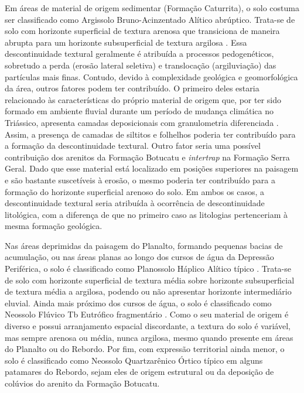 Em áreas de material de origem sedimentar (Formação Caturrita), o solo costuma ser classificado como 
Argissolo Bruno-Acinzentado Alítico abrúptico. Trata-se de solo com horizonte superficial de textura arenosa 
que transiciona de maneira abrupta para um horizonte subsuperficial de textura argilosa \cite{Miguel2010}. 
Essa descontinuidade textural geralmente é atribuída a processos pedogenéticos, sobretudo a perda (erosão 
lateral seletiva) e translocação (argiluviação) das partículas mais finas. Contudo, devido à complexidade 
geológica e geomorfológica da área, outros fatores podem ter contribuído. O primeiro deles estaria relacionado 
às características do próprio material de origem que, por ter sido formado em ambiente fluvial durante um 
período de mudança climática no Triássico, apresenta camadas deposicionais com granulometria diferenciada 
\cite{PieriniEtAl2002}. Assim, a presença de camadas de siltitos e folhelhos poderia ter contribuído para a 
formação da descontinuidade textural. Outro fator seria uma possível contribuição dos arenitos da Formação 
Botucatu e \emph{intertrap} na Formação Serra Geral. Dado que esse material está localizado em posições 
superiores na paisagem e são bastante suscetíveis à erosão, o mesmo poderia ter contribuído para a formação do 
horizonte superficial arenoso do solo. Em ambos os casos, a descontinuidade textural seria atribuída à 
ocorrência de descontinuidade litológica, com a diferença de que no primeiro caso as litologias pertenceriam à 
mesma formação geológica.

Nas áreas deprimidas da paisagem do Planalto, formando pequenas bacias de acumulação, ou nas áreas planas ao 
longo dos cursos de água da Depressão Periférica, o solo é classificado como Planossolo Háplico Alítico típico 
\cite{Miguel2010}. Trata-se de solo com horizonte superficial de textura média sobre horizonte subsuperficial 
de textura média a argilosa, podendo ou não apresentar horizonte intermediário eluvial. Ainda mais próximo dos 
cursos de água, o solo é classificado como Neossolo Flúvico Tb Eutrófico fragmentário \cite{Miguel2010}. Como 
o seu material de origem é diverso e possui arranjamento espacial discordante, a textura do solo é variável, 
mas sempre arenosa ou média, nunca argilosa, mesmo quando presente em áreas do Planalto ou do Rebordo. Por 
fim, com expressão territorial ainda menor, o solo é classificado como Neossolo Quartzarênico Órtico típico em 
alguns patamares do Rebordo, sejam eles de origem estrutural ou da deposição de colúvios do arenito da 
Formação Botucatu.

